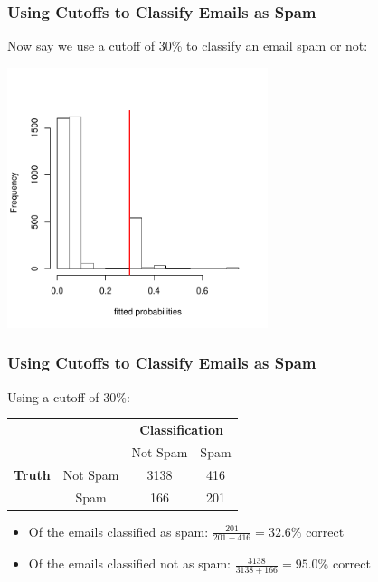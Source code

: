 \documentclass[handout]{beamer}
\newcommand{\blue}[1]{\textcolor{blue2}{#1}}
\begin{document}
\begin{frame}[fragile]
\frametitle{Using Cutoffs to Classify Emails as Spam}

Now say we use a cutoff of 30\% to \blue{classify} an email spam or not:
\begin{center}
\includegraphics[width=3in]{figure/fitted3.pdf}
\end{center}

\end{frame}


\begin{frame}[fragile]
\frametitle{Using Cutoffs to Classify Emails as Spam}

Using a cutoff of 30\%:
\begin{center}
  \begin{tabular}{cc|cc}
     \multicolumn{2}{c}{}  & \multicolumn{2}{c}{\textbf{Classification}} \\ 
     &  & Not Spam & Spam \\ 
\hline
    \textbf{Truth} & Not Spam & 3138 & 416\\
     & Spam & 166 & 201\\ 
    \hline
  \end{tabular}
\end{center}
%
%
\pause
\begin{itemize}
\item Of the emails classified as spam:  $\frac{201}{201+416} = 32.6\%$ correct
\item Of the emails classified not as spam:  $\frac{3138}{3138+166} = 95.0\%$ correct
\end{itemize}

\end{frame}
\end{document}
